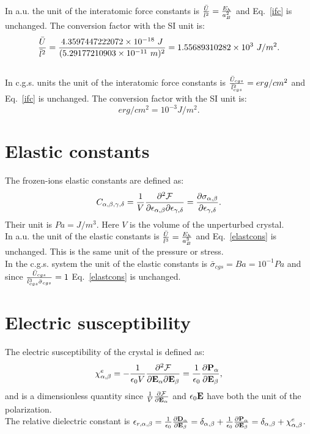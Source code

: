 \documentclass[12pt,a4paper]{article}
\def\abohr{5.29177210903\times 10^{-11}}
\def\baru{4.3597447222072\times 10^{-18}}
\def\barifc{1.55689310282\times 10^{3}}
\begin{document}
{\color{web-blue} In a.u. the unit of the interatomic force constants is 
${\bar U \over \bar l^2}={E_h\over a_B^2}$ and Eq.~\ref{ifc} is 
unchanged.
The conversion factor with the SI unit is:
\begin{equation}
{\bar U \over \bar l^2}={\baru\ J \over (\abohr\ m)^2}=\barifc\ J/m^2.
\end{equation}
}
\\

{\color{orange} In c.g.s. units the unit of the interatomic 
force constants is 
${\bar U_{cgs} \over \bar l_{cgs}^2}=erg/cm^2$ and Eq.~\ref{ifc} is 
unchanged.
The conversion factor with the SI unit is:
\begin{equation}
erg/cm^2= 10^{-3} J/m^2.
\end{equation}
}

\newpage
\section{\color{coral}Elastic constants}
The frozen-ions elastic constants are defined as:
\begin{equation}
C_{\alpha,\beta,\gamma,\delta}= {1\over V} 
{\partial^2 \mathcal{F} \over \partial 
\epsilon_{\alpha,\beta} \partial \epsilon_{\gamma,\delta}}={\partial
\sigma_{\alpha,\beta}\over \partial \epsilon_{\gamma,\delta}}.
\label{elastcons}
\end{equation}
Their unit is $Pa=J/m^3$. Here $V$ is the volume of the unperturbed crystal.
\\

{\color{web-blue} In a.u. the unit of the elastic constants is 
${\bar U \over \bar l^3}={E_h\over a_B^3}$ and Eq.~\ref{elastcons} is 
unchanged. This is the same unit of the pressure or stress.
}
\\

{\color{orange} In the c.g.s. system the unit of the elastic constants
is $\bar \sigma_{cgs}=Ba=10^{-1} Pa$ and since ${\bar U_{cgs} \over 
\bar l_{cgs}^3 \bar \sigma_{cgs}}=1$ Eq.~\ref{elastcons} is unchanged.
\\
}

\newpage
\section{\color{coral}Electric susceptibility}
The electric susceptibility of the crystal is defined as:
\begin{equation}
\chi^e_{\alpha,\beta}=-{1\over \epsilon_0 V} 
{\partial^2 \mathcal{F} \over \partial 
{\bf E}_{\alpha} \partial {\bf E}_{\beta}}= {1\over \epsilon_0}
{\partial {\bf P}_\alpha \over \partial {\bf E}_{\beta}},
\end{equation}
and is a dimensionless quantity since ${1\over V} 
{\partial \mathcal{F} \over \partial 
{\bf E}_{\alpha}}$ and $\epsilon_0 {\bf E}$ have both the unit of
the polarization.\\
The relative dielectric constant is $\epsilon_{r,\alpha,\beta}=
{1\over \epsilon_0} {\partial {\bf D}_{\alpha} \over \partial {\bf E}_{\beta}}=
\delta_{\alpha,\beta} 
+{1\over \epsilon_0} {\partial {\bf P}_\alpha \over \partial {\bf E}_\beta} = 
\delta_{\alpha,\beta} + 
\chi^e_{\alpha,\beta}$.
\\
\end{document}
